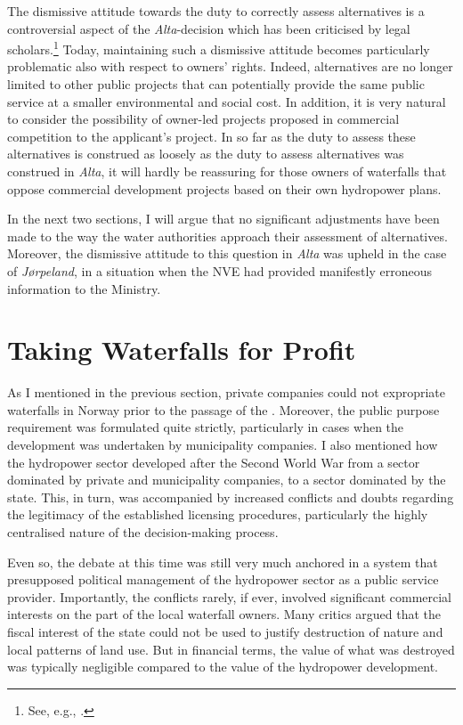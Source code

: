 The dismissive attitude towards the duty to correctly assess alternatives is a controversial aspect of the {\it Alta}-decision which has been criticised by legal scholars.\footnote{See, e.g., \cite[580-584]{backer86}.} Today, maintaining such a dismissive attitude becomes particularly problematic also with respect to owners' rights. Indeed, alternatives are no longer limited to other public projects that can potentially provide the same public service at a smaller environmental and social cost. In addition, it is very natural to consider the possibility of owner-led projects proposed in commercial competition to the applicant's project. In so far as the duty to assess these alternatives is construed as loosely as the duty to assess alternatives was construed in {\it Alta}, it will hardly be reassuring for those owners of waterfalls that oppose commercial development projects based on their own hydropower plans.

In the next two sections, I will argue that no significant adjustments have been made to the way the water authorities approach their assessment of alternatives. Moreover, the dismissive attitude to this question in {\it Alta} was upheld in the case of {\it Jørpeland}, in a situation when the NVE had provided manifestly erroneous information to the Ministry.

\section{Taking Waterfalls for Profit}\label{sec:twpp}

As I mentioned in the previous section, private companies could not expropriate waterfalls in Norway prior to the passage of the \cite{wra00}. Moreover, the public purpose requirement was formulated quite strictly, particularly in cases when the development was undertaken by municipality companies. I also mentioned how the hydropower sector developed after the Second World War from a sector dominated by private and municipality companies, to a sector dominated by the state. This, in turn, was accompanied by increased conflicts and doubts regarding the legitimacy of the established licensing procedures, particularly the highly centralised nature of the decision-making process. 

Even so, the debate at this time was still very much anchored in a system that presupposed political management of the hydropower sector as a public service provider. Importantly, the conflicts rarely, if ever, involved significant commercial interests on the part of the local waterfall owners. Many critics argued that the fiscal interest of the state could not be used to justify destruction of nature and local patterns of land use. But in financial terms, the value of what was destroyed was typically negligible compared to the value of the hydropower development.

